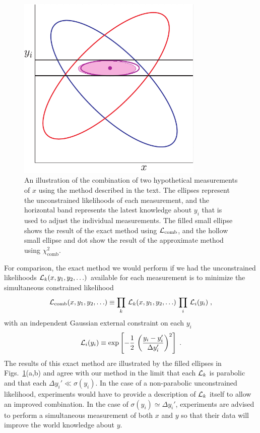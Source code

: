 \begin{figure}
\begin{center}
\includegraphics[width=3.5in]{figures/meth/figure3}
\end{center}
\caption{An illustration of the combination of two hypothetical
  measurements of $x$ using the method described in the text. The
  ellipses represent the unconstrained likelihoods of each measurement,
  and the horizontal band represents the latest knowledge about $y_i$ 
  that is used to adjust the individual measurements. The filled small
  ellipse shows the result of the exact method using 
  ${\cal L}_{\text{comb}}$, and the hollow small ellipse and dot show 
  the result of the approximate method using $\chi^2_{\text{comb}}$.}
\label{fig:fit12}
\end{figure}

For comparison, the exact method we would
perform if we had the unconstrained likelihoods ${\cal L}_k(x,y_1,y_2,\ldots)$
available for each
measurement is to minimize the simultaneous constrained likelihood
\begin{equation}
{\cal L}_{\text{comb}}(x,y_1,y_2,\ldots) \equiv \prod_k\,{\cal
  L}_k(x,y_1,y_2,\ldots)\,\prod_{i}\,{\cal 
  L}_i(y_i) \; ,
\end{equation}
with an independent Gaussian external constraint on each $y_i$
\begin{equation}
{\cal L}_i(y_i) \equiv \exp\left[-\frac{1}{2}\,\left(\frac{y_i-y_i'}{\Delta
 y_i'}\right)^2\right] \; .
\end{equation}
The results of this exact method are illustrated by the filled ellipses
in Figs.~\ref{fig:fit12}(a,b) and agree with our method in the limit that
each ${\cal L}_k$ is parabolic and that each $\Delta
y_i' \ll \sigma(y_i)$. In the case of a non-parabolic unconstrained
likelihood, experiments would have to provide a description of ${\cal
  L}_k$ itself to allow an improved combination. In the case of
$\sigma(y_i)\simeq \Delta y_i'$, experiments are advised to perform a
simultaneous measurement of both $x$ and $y$ so that their data will
improve the world knowledge about $y$. 

